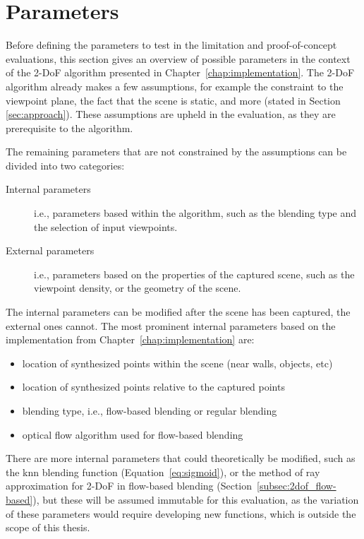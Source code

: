 \section{Parameters} \label{sec:params}
Before defining the parameters to test in the limitation and proof-of-concept evaluations, this section gives an overview of possible parameters in the context of the 2-DoF algorithm presented in Chapter~\ref{chap:implementation}.
The 2-DoF algorithm already makes a few assumptions, for example the constraint to the viewpoint plane, the fact that the scene is static, and more (stated in Section \ref{sec:approach}). These assumptions are upheld in the evaluation, as they are prerequisite to the algorithm.

The remaining parameters that are not constrained by the assumptions can be divided into two categories: 
\begin{description}
    \item [Internal parameters] i.e., parameters based within the algorithm, such as the blending type and the selection of input viewpoints.
    \item [External parameters] i.e., parameters based on the properties of the captured scene, such as the viewpoint density, or the geometry of the scene.
\end{description}      

The internal parameters can be modified after the scene has been captured, the external ones cannot.  The most prominent internal parameters based on the implementation from Chapter~\ref{chap:implementation} are:

\begin{itemize}
  \item location of synthesized points within the scene (near walls, objects, etc)
  \item location of synthesized points relative to the captured points
  \item blending type, i.e., flow-based blending or regular blending
  \item optical flow algorithm used for flow-based blending
\end{itemize}

There are more internal parameters that could theoretically be modified, such as the knn blending function (Equation~\ref{eq:sigmoid}), or the method of ray approximation for 2-DoF in flow-based blending (Section~\ref{subsec:2dof_flow-based}), but these will be assumed immutable for this evaluation, as the variation of these parameters would require developing new functions, which is outside the scope of this thesis.

